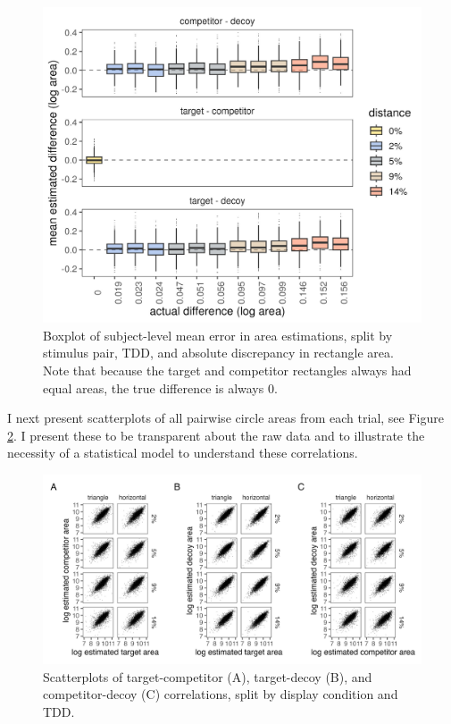 {{\begin{figure}
   \includegraphics[width=\textwidth]{figures/circleAreaPhase_boxplot_meanlogdiffs_no_outliers.jpeg}
   \caption{Boxplot of subject-level mean error in area estimations, split by stimulus pair, TDD, and absolute discrepancy in rectangle area. Note that because the target and competitor rectangles always had equal areas, the true difference is always 0.}
   \label{fig:circle_boxplots}
\end{figure}

I next present scatterplots of all pairwise circle areas from each trial, see Figure \ref{fig:raw_cors}. I present these to be transparent about the raw data and to illustrate the necessity of a statistical model to understand these correlations. 

\begin{figure}
   \includegraphics[width=\textwidth]{figures/circleAreaPhase_cor_plot_all_no_outliers.jpg}
   \caption{Scatterplots of target-competitor (A), target-decoy (B), and competitor-decoy (C) correlations, split by display condition and TDD.}
   \label{fig:raw_cors}
\end{figure}

}}
